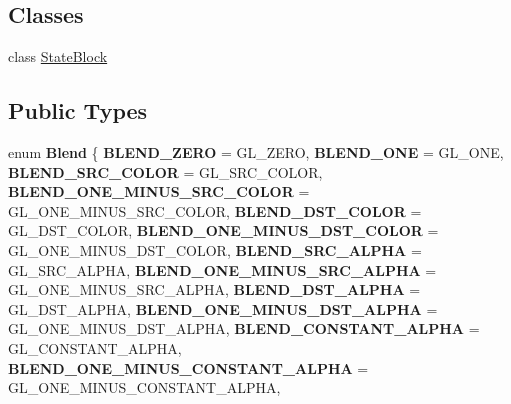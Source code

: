 \subsection*{Classes}
\begin{DoxyCompactItemize}
\item 
class \hyperlink{classRenderState_1_1StateBlock}{State\+Block}
\end{DoxyCompactItemize}
\subsection*{Public Types}
\begin{DoxyCompactItemize}
\item 
\mbox{\label{classRenderState_a75b27b1725b8bd7053249ab7c9a4131f}} 
enum {\bfseries Blend} \{ \newline
{\bfseries B\+L\+E\+N\+D\+\_\+\+Z\+E\+RO} = G\+L\+\_\+\+Z\+E\+RO, 
{\bfseries B\+L\+E\+N\+D\+\_\+\+O\+NE} = G\+L\+\_\+\+O\+NE, 
{\bfseries B\+L\+E\+N\+D\+\_\+\+S\+R\+C\+\_\+\+C\+O\+L\+OR} = G\+L\+\_\+\+S\+R\+C\+\_\+\+C\+O\+L\+OR, 
{\bfseries B\+L\+E\+N\+D\+\_\+\+O\+N\+E\+\_\+\+M\+I\+N\+U\+S\+\_\+\+S\+R\+C\+\_\+\+C\+O\+L\+OR} = G\+L\+\_\+\+O\+N\+E\+\_\+\+M\+I\+N\+U\+S\+\_\+\+S\+R\+C\+\_\+\+C\+O\+L\+OR, 
\newline
{\bfseries B\+L\+E\+N\+D\+\_\+\+D\+S\+T\+\_\+\+C\+O\+L\+OR} = G\+L\+\_\+\+D\+S\+T\+\_\+\+C\+O\+L\+OR, 
{\bfseries B\+L\+E\+N\+D\+\_\+\+O\+N\+E\+\_\+\+M\+I\+N\+U\+S\+\_\+\+D\+S\+T\+\_\+\+C\+O\+L\+OR} = G\+L\+\_\+\+O\+N\+E\+\_\+\+M\+I\+N\+U\+S\+\_\+\+D\+S\+T\+\_\+\+C\+O\+L\+OR, 
{\bfseries B\+L\+E\+N\+D\+\_\+\+S\+R\+C\+\_\+\+A\+L\+P\+HA} = G\+L\+\_\+\+S\+R\+C\+\_\+\+A\+L\+P\+HA, 
{\bfseries B\+L\+E\+N\+D\+\_\+\+O\+N\+E\+\_\+\+M\+I\+N\+U\+S\+\_\+\+S\+R\+C\+\_\+\+A\+L\+P\+HA} = G\+L\+\_\+\+O\+N\+E\+\_\+\+M\+I\+N\+U\+S\+\_\+\+S\+R\+C\+\_\+\+A\+L\+P\+HA, 
\newline
{\bfseries B\+L\+E\+N\+D\+\_\+\+D\+S\+T\+\_\+\+A\+L\+P\+HA} = G\+L\+\_\+\+D\+S\+T\+\_\+\+A\+L\+P\+HA, 
{\bfseries B\+L\+E\+N\+D\+\_\+\+O\+N\+E\+\_\+\+M\+I\+N\+U\+S\+\_\+\+D\+S\+T\+\_\+\+A\+L\+P\+HA} = G\+L\+\_\+\+O\+N\+E\+\_\+\+M\+I\+N\+U\+S\+\_\+\+D\+S\+T\+\_\+\+A\+L\+P\+HA, 
{\bfseries B\+L\+E\+N\+D\+\_\+\+C\+O\+N\+S\+T\+A\+N\+T\+\_\+\+A\+L\+P\+HA} = G\+L\+\_\+\+C\+O\+N\+S\+T\+A\+N\+T\+\_\+\+A\+L\+P\+HA, 
{\bfseries B\+L\+E\+N\+D\+\_\+\+O\+N\+E\+\_\+\+M\+I\+N\+U\+S\+\_\+\+C\+O\+N\+S\+T\+A\+N\+T\+\_\+\+A\+L\+P\+HA} = G\+L\+\_\+\+O\+N\+E\+\_\+\+M\+I\+N\+U\+S\+\_\+\+C\+O\+N\+S\+T\+A\+N\+T\+\_\+\+A\+L\+P\+HA, 

\end{DoxyCompactItemize}
